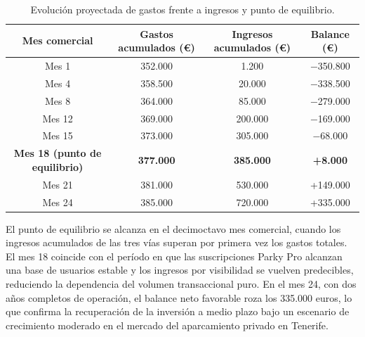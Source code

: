 \begin{table}[htbp]
    \centering
    \renewcommand{\arraystretch}{1.2}
    \begin{tabular}{cccc}
        \toprule
        \textbf{Mes comercial}                & \textbf{Gastos acumulados (€)} & \textbf{Ingresos acumulados (€)} & \textbf{Balance (€)} \\
        \midrule
        Mes 1                                 & 352.000                        & 1.200                            & $-$350.800           \\
        Mes 4                                 & 358.500                        & 20.000                           & $-$338.500           \\
        Mes 8                                 & 364.000                        & 85.000                           & $-$279.000           \\
        Mes 12                                & 369.000                        & 200.000                          & $-$169.000           \\
        Mes 15                                & 373.000                        & 305.000                          & $-$68.000            \\
        \textbf{Mes 18 (punto de equilibrio)} & \textbf{377.000}               & \textbf{385.000}                 & \textbf{+8.000}      \\
        Mes 21                                & 381.000                        & 530.000                          & +149.000             \\
        Mes 24                                & 385.000                        & 720.000                          & +335.000             \\
        \bottomrule
    \end{tabular}
    \caption{Evolución proyectada de gastos frente a ingresos y punto de equilibrio.}
    \label{tab:roi}
\end{table}

El punto de equilibrio se alcanza en el decimoctavo mes comercial, cuando los ingresos acumulados de las tres vías superan por primera vez los gastos totales. El mes 18 coincide con el período en que las suscripciones Parky Pro alcanzan una base de usuarios estable y los ingresos por visibilidad se vuelven predecibles, reduciendo la dependencia del volumen transaccional puro. En el mes 24, con dos años completos de operación, el balance neto favorable roza los 335.000 euros, lo que confirma la recuperación de la inversión a medio plazo bajo un escenario de crecimiento moderado en el mercado del aparcamiento privado en Tenerife.
